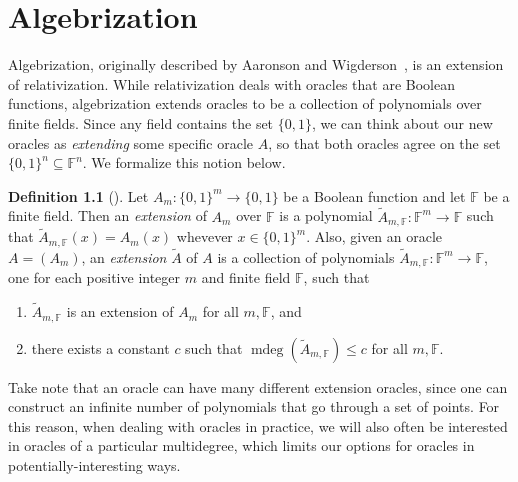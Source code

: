\documentclass[english,12pt]{reedthesis}
\theoremstyle{plain}
\theoremstyle{definition}
\newtheorem{defn}[defn]{Definition}
\theoremstyle{remark}
\DeclareMathOperator{\mdeg}{mdeg}
\begin{document}
\chapter{Algebrization}\label{chap:algebrization}

Algebrization, originally described by Aaronson and Wigderson~\cite{AW09}, is an
extension of relativization. While relativization deals with oracles that are
Boolean functions, algebrization extends oracles to be a collection of
polynomials over finite fields. Since any field contains the set $\{0, 1\}$, we
can think about our new oracles as \emph{extending} some specific oracle $A$, so
that both oracles agree on the set $\{0, 1\}^{n} \subseteq \mathbb{F}^{n}$. We formalize
this notion below.

\begin{defn}[{\cite[Def.\ 2.2]{AW09}}]\label{def:ext-oracle}
  Let $A_{m}\colon \{0, 1\}^{m} \rightarrow \{0, 1\}$ be a Boolean function and let
  $\mathbb{F}$ be a finite field. Then an \emph{extension} of $A_{m}$ over
  $\mathbb{F}$ is a polynomial
  $\tilde{A}_{m,\mathbb{F}}\colon \mathbb{F}^{m} \rightarrow \mathbb{F}$ such that
  $\tilde{A}_{m,\mathbb{F}}(x) = A_{m}(x)$ whevever $x \in \{0, 1\}^{m}$. Also,
  given an oracle $A = (A_{m})$, an \emph{extension} $\tilde{A}$ of $A$ is a
  collection of polynomials
  $\tilde{A}_{m,\mathbb{F}}\colon \mathbb{F}^{m} \rightarrow \mathbb{F}$, one for each
  positive integer $m$ and finite field $\mathbb{F}$, such that
  \begin{enumerate}
    \item $\tilde{A}_{m,\mathbb{F}}$ is an extension of $A_{m}$ for all
          $m,\mathbb{F}$, and
    \item there exists a constant $c$ such that
          $\mdeg(\tilde{A}_{m,\mathbb{F}}) \le c$ for all $m, \mathbb{F}$.
  \end{enumerate}
\end{defn}

Take note that an oracle can have many different extension oracles, since one
can construct an infinite number of polynomials that go through a set of points.
For this reason, when dealing with oracles in practice, we will also often be
interested in oracles of a particular multidegree, which limits our options for
oracles in potentially-interesting ways.
\end{document}
